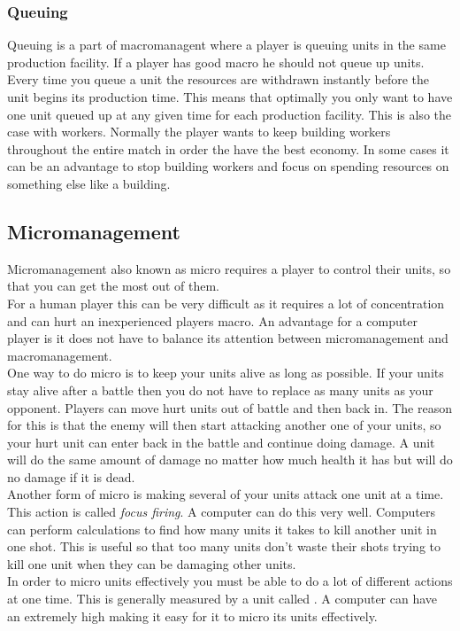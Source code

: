 			\subsubsection{Queuing}
				Queuing is a part of macromanagent where a player is queuing units in the same production facility.	If a player has good macro he should not queue up units. 
				Every time you queue a unit the resources are withdrawn instantly before the unit begins its production time. This means that optimally you only want to have one unit
 				queued up at any given time for each production facility. This is also the case with workers. Normally the player wants to keep building workers throughout the entire match
				in order the have the best economy. In some cases it can be an advantage to stop building workers and focus on spending resources on something else like a building.
				
				
	\subsection{Micromanagement}
		Micromanagement also known as micro requires a player to control their units, so that you can get the most out of them.\\
		
		For a human player this can be very difficult as it requires a lot of concentration and can hurt an inexperienced players macro. 
		An advantage for a computer player is it does not have to balance its attention between micromanagement and macromanagement.\\
		
		One way to do micro is to keep your units alive as long as possible. 
		If your units stay alive after a battle then you do not have to replace as many units as your opponent. 
		Players can move hurt units out of battle and then back in. 
		The reason for this is that the enemy will then start attacking another one of your 
		units, so your hurt unit can enter back in the battle and continue doing damage. 
		A unit will do the same amount of damage no matter how much health it has but will do no damage if it is dead.\\
		
		Another form of micro is making several of your units attack one unit at a time. This action is called \textit{focus firing}.
		A computer can do this very well. Computers can perform calculations to find how many units it takes to kill another unit in one shot.
		This is useful so that too many units don't waste their shots trying to kill one unit when they can be damaging other units.\\
		In order to micro units effectively you must be able to do a lot of different actions at one time. 
		This is generally measured by a unit called \abapm. 
		A computer can have an extremely high \abapm making it easy for it to micro its units effectively.

